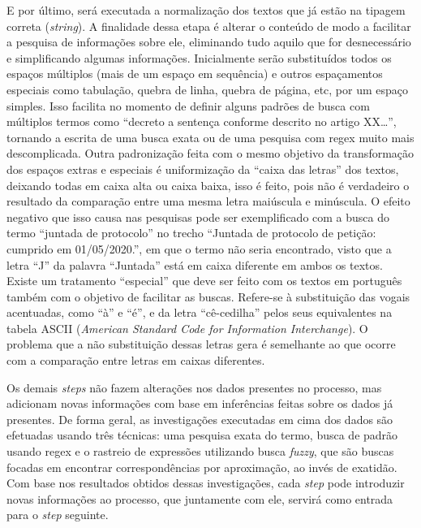 E por último, será executada a normalização dos textos que já estão na tipagem correta (\textit{string}). A finalidade dessa etapa é alterar o conteúdo de modo a facilitar a pesquisa de informações sobre ele, eliminando tudo aquilo que for desnecessário e simplificando algumas informações. Inicialmente serão substituídos todos os espaços múltiplos (mais de um espaço em sequência) e outros espaçamentos especiais como tabulação, quebra de linha, quebra de página, etc, por um espaço simples. Isso facilita no momento de definir alguns padrões de busca com múltiplos termos como \enquote{decreto a sentença conforme descrito no artigo XX\dots}, tornando a escrita de uma busca exata ou de uma pesquisa com regex muito mais descomplicada. Outra padronização feita com o mesmo objetivo da transformação dos espaços extras e especiais é uniformização da \enquote{caixa das letras} dos textos, deixando todas em caixa alta ou caixa baixa, isso é feito, pois não é verdadeiro o resultado da comparação entre uma mesma letra maiúscula e minúscula. O efeito negativo que isso causa nas pesquisas pode ser exemplificado com a busca do termo \enquote{juntada de protocolo} no trecho \enquote{Juntada de protocolo de petição: cumprido em 01/05/2020.}, em que o termo não seria encontrado, visto que a letra \enquote{J} da palavra \enquote{Juntada} está em caixa diferente em ambos os textos. Existe um tratamento \enquote{especial} que deve ser feito com os textos em português também com o objetivo de facilitar as buscas. Refere-se à substituição das vogais acentuadas, como \enquote{à} e \enquote{é}, e da letra \enquote{cê-cedilha} pelos seus equivalentes na tabela ASCII (\textit{American Standard Code for Information Interchange}). O problema que a não substituição dessas letras gera é semelhante ao que ocorre com a comparação entre letras em caixas diferentes.

Os demais \textit{steps} não fazem alterações nos dados presentes no processo, mas adicionam novas informações com base em inferências feitas sobre os dados já presentes. De forma geral, as investigações executadas em cima dos dados são efetuadas usando três técnicas: uma pesquisa exata do termo, busca de padrão usando regex e o rastreio de expressões utilizando busca \textit{fuzzy}, que são buscas focadas em encontrar correspondências por aproximação, ao invés de exatidão. Com base nos resultados obtidos dessas investigações, cada \textit{step} pode introduzir novas informações ao processo, que juntamente com ele, servirá como entrada para o \textit{step} seguinte.

